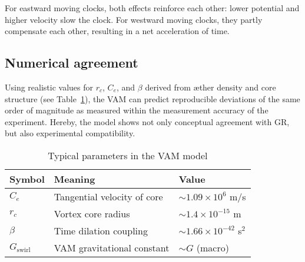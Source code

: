 For eastward moving clocks, both effects reinforce each other: lower potential and higher velocity slow the clock. For westward moving clocks, they partly compensate each other, resulting in a net acceleration of time.
\subsection{Numerical agreement}

Using realistic values for $r_c$, $C_e$, and $\beta$ derived from æther density and core structure (see Table~\ref{tab:constants}), the VAM can predict reproducible deviations of the same order of magnitude as measured within the measurement accuracy of the experiment. Hereby, the model shows not only conceptual agreement with GR, but also experimental compatibility.

\begin{table}[h!]
    \centering
    \caption{Typical parameters in the VAM model}
    \label{tab:constants}
    \begin{tabular}{lll}
        \toprule
        Symbol & Meaning & Value \\
        \midrule
        $C_e$ & Tangential velocity of core & $\sim 1.09 \times 10^6$ m/s \\
        $r_c$ & Vortex core radius & $\sim 1.4 \times 10^{-15}$ m \\
        $\beta$ & Time dilation coupling & $\sim 1.66 \times 10^{-42}$ s$^2$ \\
        $G_{\text{swirl}}$ & VAM gravitational constant & $\sim G$ (macro) \\
        \bottomrule
    \end{tabular}
\end{table}
